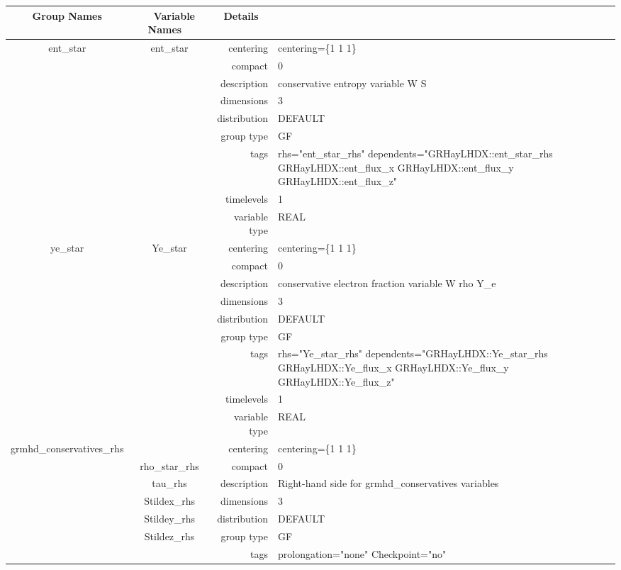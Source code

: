 \vspace{5mm}
\vspace{5mm}

\begin{tabular*}{150mm}{|c|c@{\extracolsep{\fill}}|rl|} \hline 
~ {\bf Group Names} ~ & ~ {\bf Variable Names} ~  &{\bf Details} ~ & ~ \\ 
\hline 
ent\_star & ent\_star & centering & centering=\{1 1 1\} \\ 
 &  & compact & 0 \\ 
 &  & description & conservative entropy variable W S \\ 
 &  & dimensions & 3 \\ 
 &  & distribution & DEFAULT \\ 
 &  & group type & GF \\ 
 &  & tags & rhs="ent\_star\_rhs" dependents="GRHayLHDX::ent\_star\_rhs GRHayLHDX::ent\_flux\_x GRHayLHDX::ent\_flux\_y GRHayLHDX::ent\_flux\_z" \\ 
 &  & timelevels & 1 \\ 
 &  & variable type & REAL \\ 
\hline 
ye\_star & Ye\_star & centering & centering=\{1 1 1\} \\ 
 &  & compact & 0 \\ 
 &  & description & conservative electron fraction variable W rho Y\_e \\ 
 &  & dimensions & 3 \\ 
 &  & distribution & DEFAULT \\ 
 &  & group type & GF \\ 
 &  & tags & rhs="Ye\_star\_rhs" dependents="GRHayLHDX::Ye\_star\_rhs GRHayLHDX::Ye\_flux\_x GRHayLHDX::Ye\_flux\_y GRHayLHDX::Ye\_flux\_z" \\ 
 &  & timelevels & 1 \\ 
 &  & variable type & REAL \\ 
\hline 
grmhd\_conservatives\_rhs &  & centering & centering=\{1 1 1\} \\ 
 & rho\_star\_rhs & compact & 0 \\ 
 & tau\_rhs & description & Right-hand side for grmhd\_conservatives variables \\ 
 & Stildex\_rhs & dimensions & 3 \\ 
 & Stildey\_rhs & distribution & DEFAULT \\ 
 & Stildez\_rhs & group type & GF \\ 
 &  & tags & prolongation="none" Checkpoint="no" \\ 

\end{tabular*}
